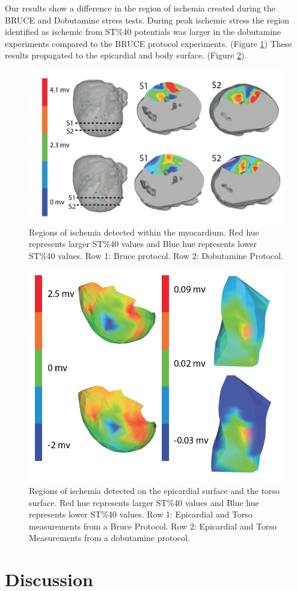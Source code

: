 \documentclass[twocolumn]{cinc}
\begin{document}
Our results show a difference in the region of ischemia created during the BRUCE and Dobutamine stress tests. During peak ischemic stress the region identified as ischemic from ST\%40 potentials was larger in the dobutamine experiments compared to the BRUCE protocol experiments. (Figure \ref{fig:myo}) These results propagated to the epicardial and body surface. (Figure \ref{fig:epitorso}).  


\begin{figure}
	\centering
	\includegraphics[width = .45\textwidth]{../Figures/1.png}
	
	\caption{ Regions of ischemia detected within the myocardium. Red hue represents larger ST\%40 values and Blue hue represents lower ST\%40 values. Row 1: Bruce protocol. Row 2: Dobutamine Protocol.}
	\label{fig:myo}
\end{figure}

\begin{figure}
	\centering
	\includegraphics[width = .45\textwidth]{../Figures/2.png}

	\caption{Regions of ischemia detected on the epicardial surface and the torso surface. Red hue represents larger ST\%40 values and Blue hue represents lower ST\%40 values. Row 1: Epicardial and Torso measurements from a Bruce Protocol. Row 2: Epicardial and Torso Measurements from a dobutamine protocol.  }
	\label{fig:epitorso}
\end{figure}

\section{Discussion}
\end{document}
